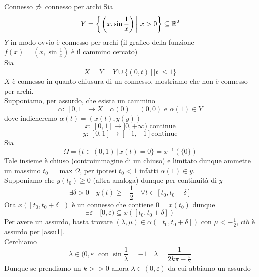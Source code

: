 \begin{ese} Connesso $\not \Rightarrow$ connesso per archi \proof
Sia 
$$ Y = \left\{ \left. \left( x, \sin \frac{1}{x}\right) \, \right\vert \, x >0 \right\} \subseteq \mathbb{R}^2 $$
$Y$ in modo ovvio \`e connesso per archi (il grafico della funzione $f(x)= \left( x , \sin \frac{1}{x}\right)$ \`e il cammino cercato)\\
Sia 
$$ X =\overline{Y}=Y \cup \{ (0,t) \, \vert \, \vert t\vert \leq 1 \}$$
$X$ \`e connesso in quanto chiusura di un connesso, mostriamo che non \`e connesso per archi.\\
Supponiamo, per assurdo, che esista un cammino 
$$ \alpha:\, [ 0, 1]\to X \quad \alpha(0)= (0,0) \text{ e } \alpha(1)\in Y$$
dove indicheremo $\alpha(t) = (x(t), y(y))$ 
$$ x:\, [ 0,1]\to [0, + \infty) \text{ continue}$$
$$y:\, [0,1]\to [-1,-1] \text{continue}$$
Sia $$\Omega=\{ t \in (0,1) \, \vert \, x(t)=0\}=x^{-1}(\{0\})$$
Tale insieme \`e chiuso (controimmagine di un chiuso) e limitato dunque ammette un massimo $t_0=\max \Omega$, per ipotesi $t_0<1$ infatti $\alpha(1)\in y$.\\
Supponiamo che $y(t_0)\geq 0$ (altra analoga) dunque per continuit\`a di $y$ 
\begin{equation}
\label{assu1}
 \exists \delta >0 \quad y(t) \geq - \frac{1}{2} \quad \forall t \in [t_0,t_0+\delta]
 \end{equation}
Ora $x ( [ t_0 ,t_0 + \delta] ) $ \`e un connesso che contiene $0=x(t_0)$ dunque
$$ \exists \varepsilon \quad [0,\varepsilon) \subseteq x ( [t_0, t_0 +\delta])$$
Per avere un assurdo, basta trovare $(\lambda, \mu) \in \alpha([t_0,t_0+\delta])$ con $\mu< -\frac{1}{2}$, ci\`o \`e assurdo per \ref{assu1}.\\
Cerchiamo $$\lambda\in (0,\varepsilon] \text{ con } \sin \frac{1}{\lambda}=-1 \quad \lambda =\frac{1}{2k\pi-\frac{\pi}{2}}$$
Dunque se prendiamo un $k>>0$ allora $\lambda\in (0, \varepsilon)$ da cui abbiamo un assurdo
\end{ese}

